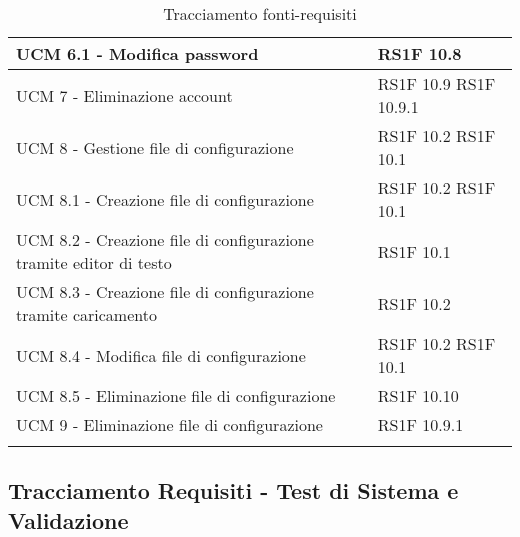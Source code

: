 \begin{center}
\begin{longtable}{ | p{5cm} | p{5cm} |}
						UCM 6.1 - Modifica password &  RS1F 10.8 \newline  \\ \hline      
						UCM 7 - Eliminazione account &  RS1F 10.9 \newline  RS1F 10.9.1 \newline  \\ \hline      
						UCM 8 - Gestione file di configurazione &  RS1F 10.2 \newline  RS1F 10.1 \newline  \\ \hline      
						UCM 8.1 - Creazione file di configurazione &  RS1F 10.2 \newline  RS1F 10.1 \newline  \\ \hline      
						UCM 8.2 - Creazione file di configurazione tramite editor di testo &  RS1F 10.1 \newline  \\ \hline      
						UCM 8.3 - Creazione file di configurazione tramite caricamento &  RS1F 10.2 \newline  \\ \hline      
						UCM 8.4 - Modifica file di configurazione &  RS1F 10.2 \newline  RS1F 10.1 \newline  \\ \hline      
						UCM 8.5 - Eliminazione file di configurazione &  RS1F 10.10 \newline  \\ \hline      
						UCM 9 - Eliminazione file di configurazione &  RS1F 10.9.1 \newline  \\ \hline  
			\caption{Tracciamento fonti-requisiti}   
			\end{longtable}
			\egroup
			\end{center}  
\clearpage
\subsection{Tracciamento Requisiti - Test di Sistema e Validazione}

